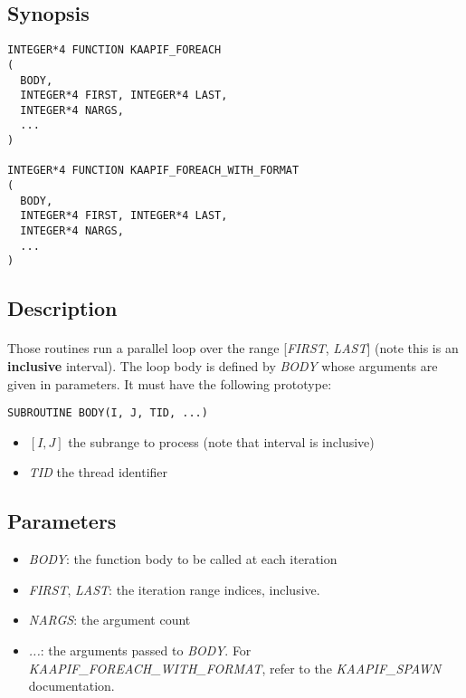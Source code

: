 \documentclass[a4paper, 11pt]{article}
\begin{document}
\subsection{Synopsis}
\begin{small}
\lstset{language=C}
\begin{lstlisting}[frame=tb]
INTEGER*4 FUNCTION KAAPIF_FOREACH
(
  BODY,
  INTEGER*4 FIRST, INTEGER*4 LAST,
  INTEGER*4 NARGS,
  ...
)

INTEGER*4 FUNCTION KAAPIF_FOREACH_WITH_FORMAT
(
  BODY,
  INTEGER*4 FIRST, INTEGER*4 LAST,
  INTEGER*4 NARGS,
  ...
)
\end{lstlisting}
\end{small}

\subsection{Description}
\paragraph{}
Those routines run a parallel loop over the range [\textit{FIRST}, \textit{LAST}]
(note this is an \textbf{inclusive} interval).
The loop body is defined by \textit{BODY} whose arguments are given
in parameters. It must have the following prototype:\\
\begin{small}
\lstset{language=C}
\begin{lstlisting}[frame=tb]
SUBROUTINE BODY(I, J, TID, ...)
\end{lstlisting}
\end{small}
\begin{itemize}
\item $[I, J]$ the subrange to process (note that interval is inclusive)
\item \textit{TID} the thread identifier
\end{itemize}

\subsection{Parameters}
\begin{itemize}
\item \textit{BODY}: the function body to be called at each iteration
\item \textit{FIRST}, \textit{LAST}: the iteration range indices, inclusive.
\item \textit{NARGS}: the argument count
\item \textit{...}: the arguments passed to \textit{BODY}. For
\textit{KAAPIF\_FOREACH\_WITH\_FORMAT}, refer to the \textit{KAAPIF\_SPAWN}
documentation.
\end{itemize}
\end{document}
